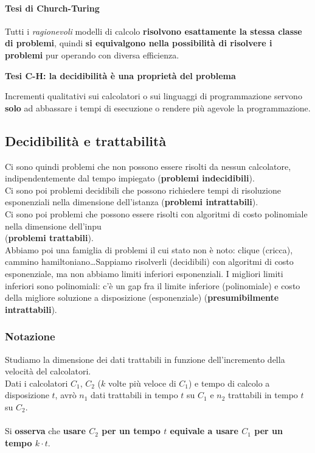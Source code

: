 \documentclass[10pt]{book}
\begin{document}
\paragraph{Tesi di Church-Turing} Tutti i \textit{ragionevoli} modelli di calcolo \textbf{risolvono esattamente la stessa classe di problemi}, quindi \textbf{si equivalgono nella possibilità di risolvere i problemi} pur operando con diversa efficienza.
\begin{center}
\textbf{Tesi C-H: la decidibilità è una proprietà del problema}
\end{center}
Incrementi qualitativi sui calcolatori o sui linguaggi di programmazione servono \textbf{solo} ad abbassare i tempi di esecuzione o rendere più agevole la programmazione.
\subsection{Decidibilità e trattabilità}
Ci sono quindi problemi che non possono essere risolti da nessun calcolatore, indipendentemente dal tempo impiegato (\textbf{problemi indecidibili}).\\
Ci sono poi problemi decidibili che possono richiedere tempi di risoluzione esponenziali nella dimensione dell'istanza (\textbf{problemi intrattabili}).\\
Ci sono poi problemi che possono essere risolti con algoritmi di costo polinomiale nella dimensione dell'inpu\\(\textbf{problemi trattabili}).\\
Abbiamo poi una famiglia di problemi il cui stato non è noto: clique (cricca), cammino hamiltoniano\ldots Sappiamo risolverli (decidibili) con algoritmi di costo esponenziale, ma non abbiamo limiti inferiori esponenziali. I migliori limiti inferiori sono polinomiali: c'è un gap fra il limite inferiore (polinomiale) e costo della migliore soluzione a disposizione (esponenziale) (\textbf{presumibilmente intrattabili}).
\subsubsection{Notazione}
Studiamo la dimensione dei dati trattabili in funzione dell'incremento della velocità del calcolatori.\\
Dati i calcolatori $C_1$, $C_2$ ($k$ volte più veloce di $C_1$) e tempo di calcolo a disposizione $t$, avrò $n_1$ dati trattabili in tempo $t$ su $C_1$ e $n_2$ trattabili in tempo $t$ su $C_2$.\\\\
Si \textbf{osserva} che \textbf{usare $C_2$ per un tempo $t$ equivale a usare $C_1$ per un tempo $k\cdot t$}.
\end{document}

